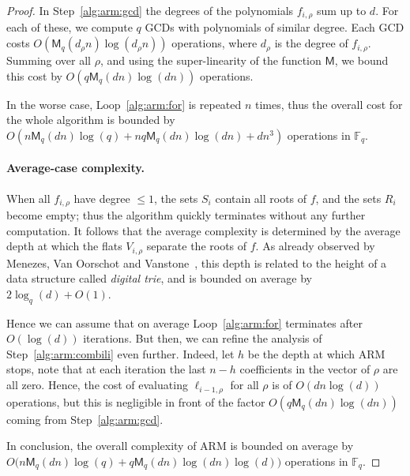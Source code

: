 \documentclass{article}
\newcommand{\ff}[1]{\mathbb{F}_{#1}}
\newcommand{\qq}{q}
\newcommand{\basef}{\ff{\qq}}
\newcommand{\Mul}{\mathsf{M}}
\newcounter{algo}
\begin{document}
\begin{proof}
  In Step~\ref{alg:arm:gcd} the degrees of the polynomials
  $f_{i,\rho}$ sum up to $d$. %
  For each of these, we compute $q$ GCDs with polynomials of similar
  degree. %
  Each GCD costs $O(\Mul_q(d_\rho n)\log(d_\rho n))$ operations, where
  $d_\rho$ is the degree of $f_{i,\rho}$. %
  Summing over all $\rho$, and using the super-linearity of the
  function $\Mul$, we bound this cost by $O(q\Mul_q(dn)\log(dn))$
  operations.

  In the worse case, Loop~\ref{alg:arm:for} is repeated $n$ times,
  thus the overall cost for the whole algorithm is bounded by
  $O(n\Mul_q(dn)\log(q) + nq\Mul_q(dn)\log(dn) + dn^3)$ operations in
  $\basef$.

  \paragraph{Average-case complexity.} When all $f_{i,\rho}$ have
  degree $\le 1$, the sets $S_i$ contain all roots of $f$, and the sets
  $R_i$ become empty; thus the algorithm quickly terminates without
  any further computation. %
  It follows that the average complexity is determined by the average
  depth at which the flats $V_{i,\rho}$ separate the roots of $f$. %
  As already observed by Menezes, Van Oorschot and
  Vanstone~\cite[Theorem~7]{Menvanovans92}, this depth is related to
  the height of a data structure called \emph{digital trie}, and is
  bounded on average by $2\log_q(d) + O(1)$.

  Hence we can assume that on average Loop~\ref{alg:arm:for}
  terminates after $O(\log(d))$ iterations. %
  But then, we can refine the analysis of Step~\ref{alg:arm:combili}
  even further. %
  Indeed, let $h$ be the depth at which ARM stops, note that at each
  iteration the last $n-h$ coefficients in the vector of $\rho$ are
  all zero. %
  Hence, the cost of evaluating $\ell_{i-1,\rho}$ for all $\rho$ is of
  $O(dn\log(d))$ operations, but this is negligible in front of the
  factor $O(q\Mul_q(dn)\log(dn))$ coming from Step~\ref{alg:arm:gcd}.

  In conclusion, the overall complexity of ARM is bounded on average
  by $O\bigl(n\Mul_q(dn)\log(q) + q\Mul_q(dn)\log(dn)\log(d)\bigr)$
  operations in $\basef$.
\end{proof}
\end{document}
